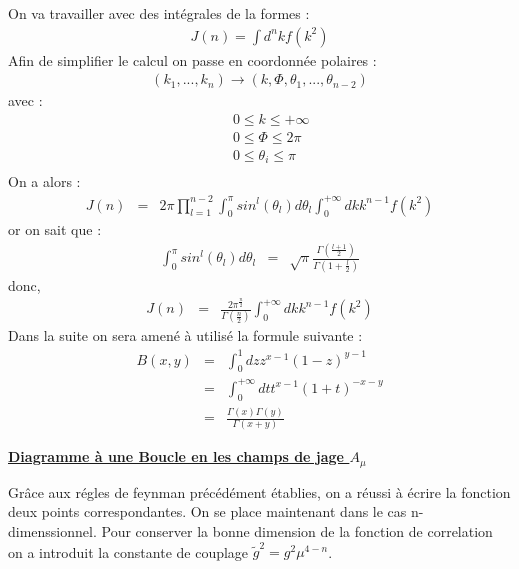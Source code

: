 \documentclass[a4paper,11pt]{article} %
\theoremstyle{plain}
\theoremstyle{definition}
\theoremstyle{remark}
\numberwithin{equation}{section}
\numberwithin{equation}{subsection}
\numberwithin{figure}{section}
\begin{document}
\noindent
On va travailler avec des intégrales de la formes : 
\begin{eqnarray*}
 J(n) = \int d^{n}k f(k^2)
\end{eqnarray*}
Afin de simplifier le calcul on passe en coordonnée polaires : 
\begin{eqnarray*}
 \left( k_{1} , ... , k_{n} \right) \rightarrow \left( k, \Phi, \theta_{1}, ... , \theta_{n-2} \right)
\end{eqnarray*}
avec :
\begin{eqnarray*}
 && 0 \leq k \leq + \infty \\
 && 0 \leq \Phi \leq 2 \pi \\
 && 0 \leq \theta_{i} \leq \pi \\
\end{eqnarray*}
On a alors :
\begin{eqnarray*}
 J(n) &=& 2 \pi  \prod_{l=1}^{n-2} \int_{0}^{\pi} sin^{l}(\theta_{l}) d\theta_{l}  \int_{0}^{+\infty} dk k^{n-1} f(k^2)
\end{eqnarray*}
or on sait que :
\begin{eqnarray*}
 \int_{0}^{\pi} sin^{l}(\theta_{l}) d\theta_{l}   &=& \sqrt{\pi} \frac{\Gamma(\frac{l+1}{2})}{\Gamma(1+\frac{l}{2})}
\end{eqnarray*}
donc,
\begin{eqnarray*}
 J(n) &=& \frac{2 \pi ^{\frac{n}{2}}}{\Gamma(\frac{n}{2})} \int_{0}^{+\infty} dk k^{n-1} f(k^2)
\end{eqnarray*}
Dans la suite on sera amené à utilisé la formule suivante :
\begin{eqnarray*}
 B(x,y) &=& \int_{0}^{1} dz z^{x-1} (1-z)^{y-1} \\
            &=& \int_{0}^{+\infty}  dt t^{x-1} (1+t)^{-x-y} \\
            &=& \frac{\Gamma(x) \Gamma(y)}{\Gamma(x+y)}
\end{eqnarray*}

\noindent
\underline{\textbf{Diagramme à une Boucle en les champs de jage $A_{\mu}$}}


\noindent
Grâce aux régles de feynman précédément établies, on a réussi à écrire la fonction deux points correspondantes. On se place maintenant 
dans le cas n-dimenssionnel. Pour conserver la bonne dimension de la fonction de correlation on a introduit la constante de 
couplage $\tilde{g}^{2} = g^{2} \mu^{4-n}$.
\end{document}
